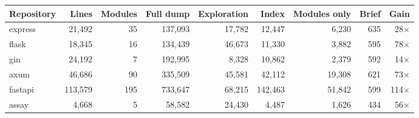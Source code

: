 \begin{tabular}{lrrrrrrrr}
\toprule
Repository & Lines & Modules & Full dump & Exploration & Index & Modules only & Brief & Gain \\
\midrule
express & 21,492 & 35 & 137,093 & 17,782 & 12,447 & 6,230 & 635 & 28$\times$ \\
flask & 18,345 & 16 & 134,439 & 46,673 & 11,330 & 3,882 & 595 & 78$\times$ \\
gin & 24,192 & 7 & 192,995 & 8,328 & 10,862 & 2,379 & 592 & 14$\times$ \\
axum & 46,686 & 90 & 335,509 & 45,581 & 42,112 & 19,308 & 621 & 73$\times$ \\
fastapi & 113,579 & 195 & 733,647 & 68,215 & 142,463 & 51,842 & 599 & 114$\times$ \\
assay & 4,668 & 5 & 58,582 & 24,430 & 4,487 & 1,626 & 434 & 56$\times$ \\
\bottomrule
\end{tabular}
